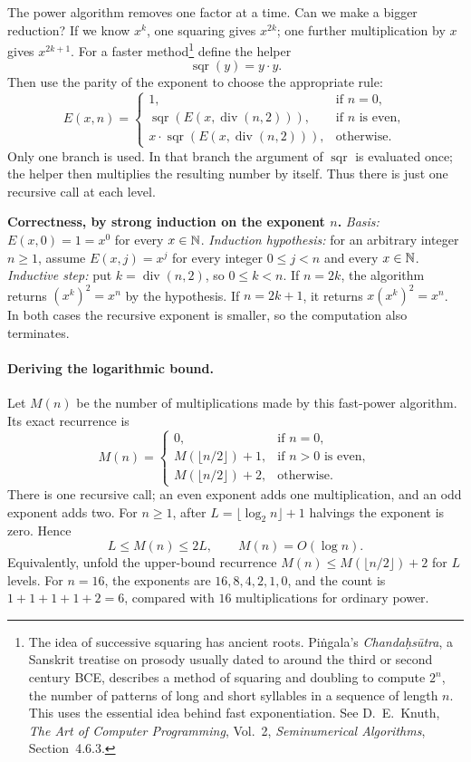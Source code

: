 The power algorithm removes one factor at a time. Can we make a bigger
reduction? If we know $x^k$, one squaring gives $x^{2k}$; one further
multiplication by $x$ gives $x^{2k+1}$. For a faster method\footnote{The idea of successive squaring has ancient roots.
Pi\.ngala's \emph{Chanda\d{h}s\=utra}, a Sanskrit treatise on
prosody usually dated to around the third or second century BCE,
describes a method of squaring and doubling to compute $2^n$,
the number of patterns of long and short syllables in a sequence
of length $n$. This uses the essential idea behind fast
exponentiation. See D.~E.~Knuth, \emph{The Art of Computer
Programming}, Vol.~2, \emph{Seminumerical Algorithms},
Section~4.6.3.} define the helper
\[
\operatorname{sqr}(y)=y\cdot y.
\]
Then use the parity of the exponent to choose the appropriate rule:
\[
E(x,n)=\begin{cases}
1,&\text{if }n=0,\\
\operatorname{sqr}(E(x,\operatorname{div}(n,2))),&\text{if }n\text{ is even},\\
x\cdot\operatorname{sqr}(E(x,\operatorname{div}(n,2))),&\text{otherwise}.
\end{cases}
\]
Only one branch is used. In that branch the argument of $\operatorname{sqr}$
is evaluated once; the helper then multiplies the resulting number by itself.
Thus there is just one recursive call at each level.

\textbf{Correctness, by strong induction on the exponent $n$.}
\emph{Basis:} $E(x,0)=1=x^0$ for every $x\in\mathbb{N}$.
\emph{Induction hypothesis:} for an arbitrary integer $n\geq1$, assume
$E(x,j)=x^j$ for every integer $0\leq j<n$ and every $x\in\mathbb{N}$.
\emph{Inductive step:} put $k=\operatorname{div}(n,2)$, so $0\leq k<n$.
If $n=2k$, the algorithm returns $(x^k)^2=x^n$ by the hypothesis.
If $n=2k+1$, it returns $x(x^k)^2=x^n$. In both cases the recursive
exponent is smaller, so the computation also terminates.

\paragraph{Deriving the logarithmic bound.}
Let $M(n)$ be the number of multiplications made by this fast-power algorithm.
Its exact recurrence is
\[
M(n)=\begin{cases}
0,&\text{if }n=0,\\
M(\lfloor n/2\rfloor)+1,&\text{if }n>0\text{ is even},\\
M(\lfloor n/2\rfloor)+2,&\text{otherwise}.
\end{cases}
\]
There is one recursive call; an even exponent adds one multiplication,
and an odd exponent adds two. For $n\geq1$, after
$L=\lfloor\log_2 n\rfloor+1$ halvings the exponent is zero. Hence
\[
L\leq M(n)\leq2L,
\qquad M(n)=O(\log{n}).
\]
Equivalently, unfold the upper-bound recurrence
$M(n)\leq M(\lfloor n/2\rfloor)+2$ for $L$ levels.
For $n=16$, the exponents are $16,8,4,2,1,0$, and the count is
$1+1+1+1+2=6$, compared with $16$ multiplications for ordinary power.

